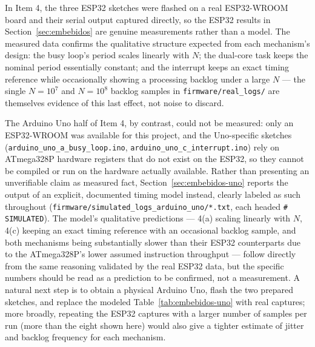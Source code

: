 In Item 4, the three ESP32 sketches were flashed on a real ESP32-WROOM board and their serial output captured directly, so the ESP32 results in Section~\ref{sec:embebidos} are genuine measurements rather than a model. The measured data confirms the qualitative structure expected from each mechanism's design: the busy loop's period scales linearly with $N$; the dual-core task keeps the nominal period essentially constant; and the interrupt keeps an exact timing reference while occasionally showing a processing backlog under a large $N$ — the single $N=10^7$ and $N=10^8$ backlog samples in \texttt{firmware/real\_logs/} are themselves evidence of this last effect, not noise to discard.

The Arduino Uno half of Item 4, by contrast, could not be measured: only an ESP32-WROOM was available for this project, and the Uno-specific sketches (\texttt{arduino\_uno\_a\_busy\_loop.ino}, \texttt{arduino\_uno\_c\_interrupt.ino}) rely on ATmega328P hardware registers that do not exist on the ESP32, so they cannot be compiled or run on the hardware actually available. Rather than presenting an unverifiable claim as measured fact, Section~\ref{sec:embebidos-uno} reports the output of an explicit, documented timing model instead, clearly labeled as such throughout (\texttt{firmware/simulated\_logs\_arduino\_uno/*.txt}, each headed \texttt{\# SIMULATED}). The model's qualitative predictions — 4(a) scaling linearly with $N$, 4(c) keeping an exact timing reference with an occasional backlog sample, and both mechanisms being substantially slower than their ESP32 counterparts due to the ATmega328P's lower assumed instruction throughput — follow directly from the same reasoning validated by the real ESP32 data, but the specific numbers should be read as a prediction to be confirmed, not a measurement. A natural next step is to obtain a physical Arduino Uno, flash the two prepared sketches, and replace the modeled Table~\ref{tab:embebidos-uno} with real captures; more broadly, repeating the ESP32 captures with a larger number of samples per run (more than the eight shown here) would also give a tighter estimate of jitter and backlog frequency for each mechanism.
